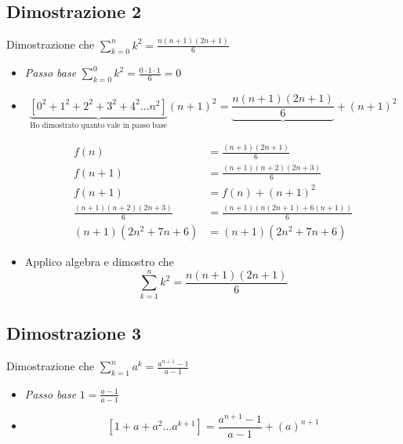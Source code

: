 \subsection{Dimostrazione 2}
\label{sub:dimostrazione2}
Dimostrazione che $\sum_{k=0}^{n} k^2 = \frac{n\left( n+1 \right) \left( 2n+1 \right) }{6} $
\begin{itemize}
	\item \textit{Passo base} $\sum_{k=0}^{0} k^2 = \frac{0 \cdot 1 \cdot 1}{6} = 0$
	\item \[
		      \underbrace{\left[0^2 + 1^2 + 2^2 + 3^2 + 4^2 \ldots n^2\right]}_{\text{Ho dimostrato quanto vale in passo base}} \left( n+1 \right)^2 = \underbrace{\frac{n\left( n+1 \right) \left( 2n+1 \right) }{6}} + \left( n+1 \right)^2
	      \]

	      \begin{align*}
		      f \left( n \right)                                                  & = \frac{\left( n+1 \right) \left( 2n+1 \right)}{6}                                       \\
		      f\left( n+1 \right)                                                 & = \frac{\left( n+1 \right) \left( n+2 \right) \left( 2n+3 \right)}{6}                    \\
		      f\left( n+1 \right)                                                 & = f\left( n \right) +\left( n+1 \right) ^2                                               \\
		      \frac{\left( n+1 \right) \left( n+2 \right) \left( 2n+3 \right)}{6} & = \frac{\left( n+1 \right) \left( n\left( 2n+1 \right) +6\left( n+1 \right)  \right)}{6} \\
		      \left( n+1 \right) \left( 2n^2 + 7n + 6 \right)                     & = \left( n+1 \right) \left( 2n^2 + 7n +6 \right)
	      \end{align*}

	\item Applico algebra e dimostro che
	      \[
		      \sum_{k=1}^{n} k^2 = \frac{n\left( n+1 \right) \left( 2n+1 \right)}{6}
	      \]

\end{itemize}
\subsection{Dimostrazione 3}
\label{sub:dimostrazione3}

Dimostrazione che $\sum_{k=1}^{n} a^{k} = \frac{a^{n+1}-1}{a-1}$
\begin{itemize}
	\item \textit{Passo base} $1=\frac{a-1}{a-1}$
	\item \[
		      \left[ 1+a+a^2 \ldots a^{k+1} \right]= \frac{a^{n+1}-1}{a-1} + \left( a \right) ^{n+1}
	      \]
\end{itemize}
